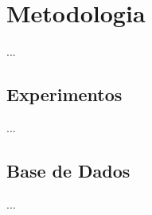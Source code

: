 \chapter{Metodologia}
\label{cap:metodologia}

...

\section{Experimentos}

...

\section{Base de Dados}

...
